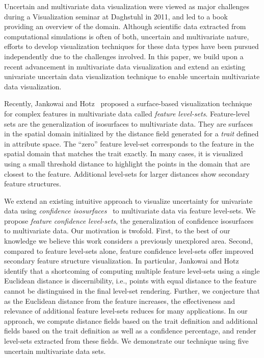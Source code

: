 Uncertain and multivariate data visualization were viewed as major challenges during a Visualization seminar at Daghstuhl in 2011, and led to a book~\cite{hansen2014scientific} providing an overview of the domain. 
%
Although scientific data extracted from computational simulations is often of both, uncertain and multivariate nature, efforts to develop visualization techniques for these data types have been pursued independently due to the challenges involved.
%
In this paper, we build upon a recent advancement in multivariate data visualization and extend an existing univariate uncertain data visualization technique to enable uncertain multivariate data visualization.

Recently, Jankowai and Hotz~\cite{jankowai2020feature} proposed a surface-based visualization technique for complex features in multivariate data called \textit{feature level-sets}. 
%
Feature-level sets are the generalization of isosurfaces to multivariate data.
%
They are surfaces in the spatial domain initialized by the distance field generated for a \textit{trait} defined in attribute space.
%
The ``zero'' feature level-set corresponds to the feature in the spatial domain that matches the trait exactly.
%
In many cases, it is visualized using a small threshold distance to highlight the points in the domain that are closest to the feature.
%
Additional level-sets for larger distances show secondary feature structures.
%


We extend an existing intuitive approach to visualize uncertainty for univariate data using \textit{confidence isosurfaces}~\cite{zehner2010visualization} to multivariate data via feature level-sets.
%
We propose \textit{feature confidence level-sets}, the generalization of confidence isosurfaces to multivariate data.
%
Our motivation is twofold.
%
First, to the best of our knowledge we believe this work considers a previously unexplored area. 
%
Second, compared to feature level-sets alone, feature confidence level-sets offer improved secondary feature structure visualization.
%
In particular, Jankowai and Hotz identify that a shortcoming of computing multiple feature level-sets using a single Euclidean distance is discernibility, i.e., points with equal distance to the feature cannot be distinguised in the final level-set rendering.
Further, we conjecture that as the Euclidean distance from the feature increases, the effectiveness and relevance of additional feature level-sets reduces for many applications.
In our approach, we compute distance fields based on the trait definition and additional fields based on the trait definition as well as a confidence percentage, and render level-sets extracted from these fields.
We demonstrate our technique using five uncertain multivariate data sets.

